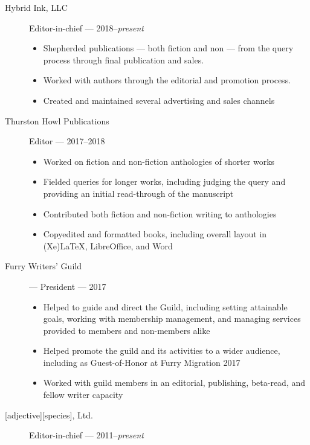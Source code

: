 \documentclass[letterpaper]{memoir}
\begin{document}
\begin{description}
\item[Hybrid Ink, LLC]
Editor-in-chief --- 2018--\emph{present}

\begin{itemize}
\tightlist
\item
  Shepherded publications --- both fiction and non --- from the query process through final publication and sales.
\item
  Worked with authors through the editorial and promotion process.
\item
  Created and maintained several advertising and sales channels
\end{itemize}
\item[Thurston Howl Publications]
Editor --- 2017--2018

\begin{itemize}
\tightlist
\item
  Worked on fiction and non-fiction anthologies of shorter works
\item
  Fielded queries for longer works, including judging the query and
  providing an initial read-through of the manuscript
\item
  Contributed both fiction and non-fiction writing to anthologies
\item
  Copyedited and formatted books, including overall layout in (Xe)LaTeX, LibreOffice, and Word
\end{itemize}
\item[Furry Writers' Guild] --- President --- 2017

\begin{itemize}
  \item Helped to guide and direct the Guild, including setting attainable goals, working with membership management, and managing services provided to members and non-members alike
  \item Helped promote the guild and its activities to a wider audience, including as Guest-of-Honor at Furry Migration 2017
  \item Worked with guild members in an editorial, publishing, beta-read, and fellow writer capacity
\end{itemize}
\item[{[}adjective{]}{[}species{]}, Ltd.]
Editor-in-chief --- 2011--\emph{present}


\end{description}
\end{document}
